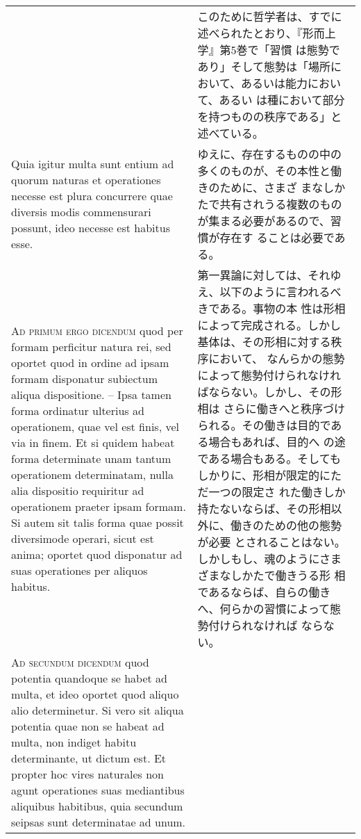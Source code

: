 \documentclass[10pt]{jsarticle} %
\begin{document}
\begin{longtable}{p{21em}p{21em}}
&

このために哲学者は、すでに述べられたとおり、『形而上学』第5巻で「習慣
は態勢であり」そして態勢は「場所において、あるいは能力において、あるい
は種において部分を持つものの秩序である」と述べている。

\\

Quia igitur multa sunt entium ad quorum naturas et
operationes necesse est plura concurrere quae diversis modis
commensurari possunt, ideo necesse est habitus esse.

&

ゆえに、存在するものの中の多くのものが、その本性と働きのために、さまざ
まなしかたで共有されうる複数のものが集まる必要があるので、習慣が存在す
ることは必要である。

\\


{\scshape Ad primum ergo dicendum} quod per formam perficitur natura rei, sed
oportet quod in ordine ad ipsam formam disponatur subiectum aliqua
dispositione. -- Ipsa tamen forma ordinatur ulterius ad operationem, quae
vel est finis, vel via in finem. Et si quidem habeat forma determinate
unam tantum operationem determinatam, nulla alia dispositio requiritur
ad operationem praeter ipsam formam. Si autem sit talis forma quae
possit diversimode operari, sicut est anima; oportet quod disponatur
ad suas operationes per aliquos habitus.

&

第一異論に対しては、それゆえ、以下のように言われるべきである。事物の本
性は形相によって完成される。しかし基体は、その形相に対する秩序において、
なんらかの態勢によって態勢付けられなければならない。しかし、その形相は
さらに働きへと秩序づけられる。その働きは目的である場合もあれば、目的へ
の途である場合もある。そしてもしかりに、形相が限定的にただ一つの限定さ
れた働きしか持たないならば、その形相以外に、働きのための他の態勢が必要
とされることはない。しかしもし、魂のようにさまざまなしかたで働きうる形
相であるならば、自らの働きへ、何らかの習慣によって態勢付けられなければ
ならない。

\\



{\scshape Ad secundum dicendum} quod potentia
quandoque se habet ad multa, et ideo oportet quod aliquo alio
determinetur. Si vero sit aliqua potentia quae non se habeat ad multa,
non indiget habitu determinante, ut dictum est. Et propter hoc vires
naturales non agunt operationes suas mediantibus aliquibus habitibus,
quia secundum seipsas sunt determinatae ad unum.


\end{longtable}
\end{document}
